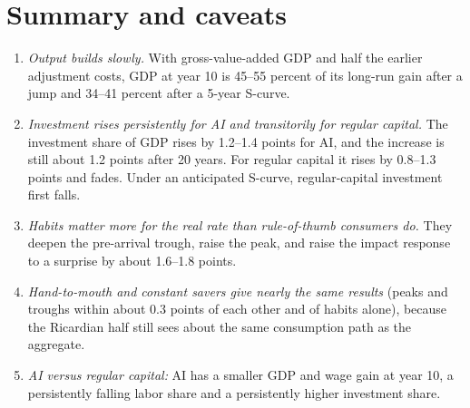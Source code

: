\documentclass[11pt]{article}
\begin{document}
\begin{table}[h]\centering\scriptsize
\caption{Embodied progress, by timing and household block. ``Decade avg.'' is the mean of $r_1,\dots,r_{10}$ minus 7.5\%. GDP is gross value added, and ``gap closed'' is GDP at year 10 as a percent of the 10\% long-run gain. The investment column is the peak change in investment/GDP (including adjustment costs) over the first 20 years, with the year in parentheses. Consumption is a log deviation from the pre-shock path.}\label{tab:emb}
\resizebox{\textwidth}{!}{}
\end{table}

\section{Summary and caveats}\label{sec:caveats}

\begin{enumerate}
\item \emph{Output builds slowly.} With gross-value-added GDP and half the earlier adjustment costs, GDP at year 10 is 45--55 percent of its long-run gain after a jump and 34--41 percent after a 5-year S-curve.
\item \emph{Investment rises persistently for AI and transitorily for regular capital.} The investment share of GDP rises by 1.2--1.4 points for AI, and the increase is still about 1.2 points after 20 years. For regular capital it rises by 0.8--1.3 points and fades.
Under an anticipated S-curve, regular-capital investment first falls.
\item \emph{Habits matter more for the real rate than rule-of-thumb consumers do.} They deepen the pre-arrival trough, raise the peak, and raise the impact response to a surprise by about 1.6--1.8 points.
\item \emph{Hand-to-mouth and constant savers give nearly the same results} (peaks and troughs within about 0.3 points of each other and of habits alone), because the Ricardian half still sees about the same consumption path as the aggregate.
\item \emph{AI versus regular capital:} AI has a smaller GDP and wage gain at year 10, a persistently falling labor share and a persistently higher investment share.
\end{enumerate}
\end{document}

